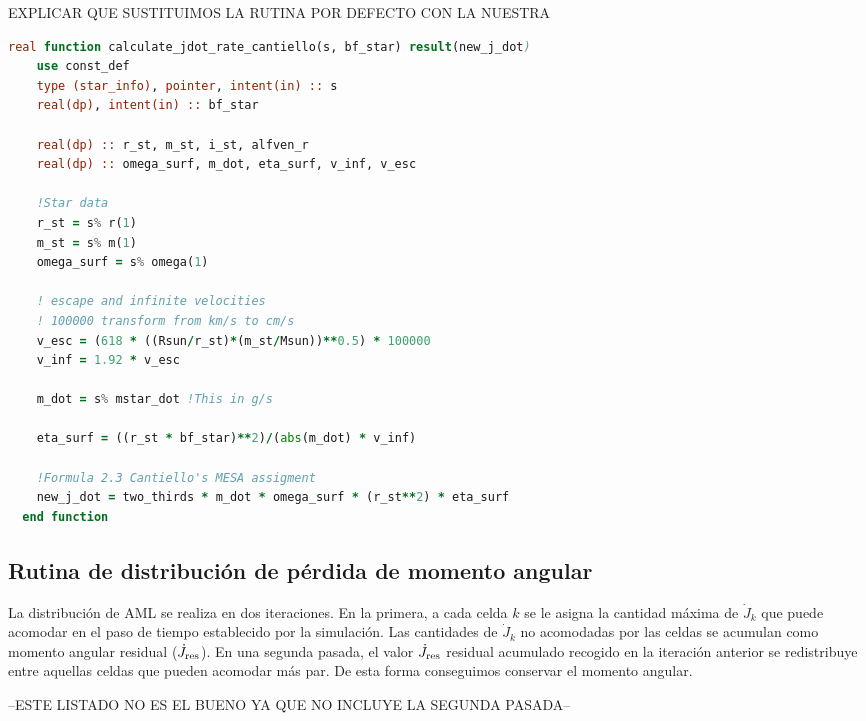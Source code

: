 EXPLICAR QUE SUSTITUIMOS LA RUTINA POR DEFECTO CON LA NUESTRA
\begin{lstlisting}[language=Fortran, caption={Rutina de par de torsión para un campo magnético de intensidad fija.}, label={lst:jdot_cantiello}]
  real function calculate_jdot_rate_cantiello(s, bf_star) result(new_j_dot)
	use const_def
	type (star_info), pointer, intent(in) :: s
	real(dp), intent(in) :: bf_star
	
	real(dp) :: r_st, m_st, i_st, alfven_r
	real(dp) :: omega_surf, m_dot, eta_surf, v_inf, v_esc
	
	!Star data
	r_st = s% r(1)
	m_st = s% m(1)
	omega_surf = s% omega(1)
	
	! escape and infinite velocities
	! 100000 transform from km/s to cm/s
	v_esc = (618 * ((Rsun/r_st)*(m_st/Msun))**0.5) * 100000
	v_inf = 1.92 * v_esc
	
	m_dot = s% mstar_dot !This in g/s
	
	eta_surf = ((r_st * bf_star)**2)/(abs(m_dot) * v_inf)
	
	!Formula 2.3 Cantiello's MESA assigment
	new_j_dot = two_thirds * m_dot * omega_surf * (r_st**2) * eta_surf
  end function
\end{lstlisting}


\subsection{Rutina de distribución de pérdida de momento angular} \label{sec:dist_aml1}
La distribución de AML se realiza en dos iteraciones. En la primera, a cada celda $k$ se le asigna la cantidad máxima de $\Dot{J}_{k}$ que puede acomodar en el paso de tiempo establecido por la simulación. Las cantidades de $\Dot{J}_{k}$ no acomodadas por las celdas se acumulan como momento angular residual ($\Dot{J}_{\mathrm{res}}$). En una segunda pasada, el valor $\Dot{J}_{\mathrm{res}}$ residual acumulado recogido en la iteración anterior se redistribuye entre aquellas celdas que pueden acomodar más par. De esta forma conseguimos conservar el momento angular.\par

--ESTE LISTADO NO ES EL BUENO YA QUE NO INCLUYE LA SEGUNDA PASADA--


